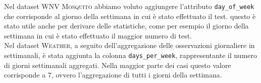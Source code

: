 
Nel dataset \textsc{WNV Mosquito} abbiamo voluto aggiungere l'attributo 
\texttt{day\_of\_week} che corrisponde al giorno della settimana in cui è stato 
effettuato il test. questo è stato utile anche per derivare delle statistiche, 
come per esempio il giorno della settimana in cui è stato effettuato il maggior 
numero di test. 
\\

Nel dataset \textsc{Weather}, a seguito dell'aggregazione delle osservazioni 
giornaliere in settimanali, è stata aggiunta la colonna 
\texttt{days\_per\_week}, rappresentante il numero di giorni settimanali 
aggregati. Nella maggior parte dei casi questo valore corrisponde a 7, ovvero 
l'aggregazione di tutti i giorni della settimana.

